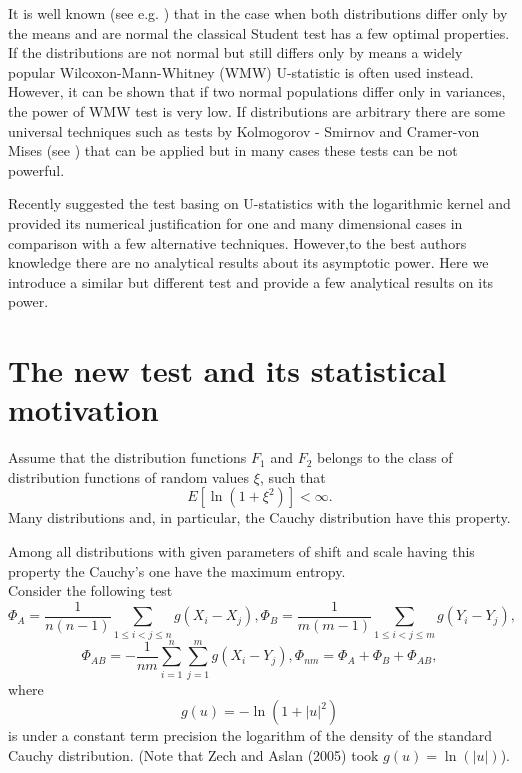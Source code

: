 \documentclass{svproc}
\begin{document}
It is well known (see e.g. \cite{Lehman1986}) that in the case when both distributions differ only by the means and are normal the classical Student test has a few optimal properties. If the distributions are not normal but still differs only by means a widely popular Wilcoxon-Mann-Whitney (WMW) U-statistic is often used instead. However, it can be shown that if two normal populations differ only in variances, the power of WMW test is very low.
If distributions are arbitrary there are some universal techniques such as tests by Kolmogorov - Smirnov and Cramer-von Mises  (see \cite{Buening2001}) that can be applied but in many cases these tests can be not powerful.

Recently \cite{AslanZech2005} suggested the test basing on U-statistics with the logarithmic kernel and provided its numerical justification for one and many dimensional cases in comparison with a few alternative techniques.  However,to the best authors knowledge there are no analytical results about its asymptotic power. Here we introduce a similar but different test and provide a few analytical results on its power.





\section{The new test and its statistical motivation}

Assume that the distribution functions
$F_1$ and $F_2$ belongs to the class of distribution functions of random values  $\xi$, such that
\begin {equation}\label{Class}
E [\ln (1+ \xi^2)     ] < \infty.
\end{equation}
Many distributions and, in particular, the Cauchy distribution have this property.
 \bigskip

Among all distributions with given parameters of shift and scale having this property the Cauchy's one have the maximum entropy.\\


Consider the following test
\begin{equation}
 \Phi_{A}=\frac{1}{n(n-1)}\sum_{1\leq i<j\leq n} g(X_i-X_j),
\Phi_{B}=\frac{1}{m(m-1)}\sum_{1\leq i<j\leq m} g(Y_i-Y_j),
\end{equation}
\begin{equation}\label{K1}
\Phi_{AB}=-\frac{1}{nm}\sum_{i=1}^n\sum_{j=1}^m g(X_i-Y_j),
\Phi_{nm}=\Phi_{A}+ \Phi_{B}+ \Phi_{AB},
\end{equation}
where
$$
g(u)= -\ln (1+|u|^2)
$$
is under a constant term precision the logarithm of the density of the standard Cauchy distribution.
(Note that Zech and Aslan (2005) took $g(u)=\ln(|u|)$).
\end{document}
